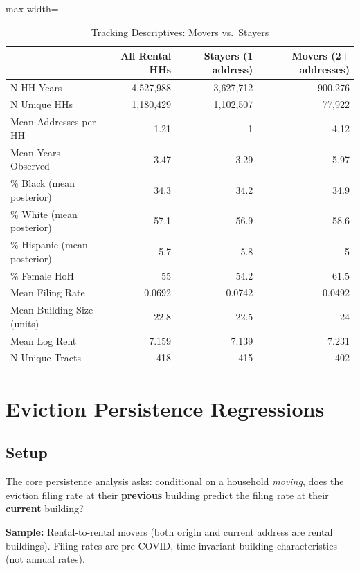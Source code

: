 \documentclass[
  11pt,
]{article}
\begin{document}
\begin{table}[htbp]
\centering
\centering
\caption{Tracking Descriptives: Movers vs.\ Stayers}
\label{tab:tracking_descriptives}

\begin{adjustbox}{max width=\textwidth}
\begin{tabular}{lrrr}
\toprule
 & All Rental HHs & Stayers (1 address) & Movers (2+ addresses) \\
\midrule
N HH-Years & 4,527,988 & 3,627,712 &   900,276 \\
N Unique HHs & 1,180,429 & 1,102,507 &    77,922 \\
Mean Addresses per HH & 1.21 & 1 & 4.12 \\
Mean Years Observed & 3.47 & 3.29 & 5.97 \\
\% Black (mean posterior) & 34.3 & 34.2 & 34.9 \\
\% White (mean posterior) & 57.1 & 56.9 & 58.6 \\
\% Hispanic (mean posterior) & 5.7 & 5.8 & 5 \\
\% Female HoH & 55 & 54.2 & 61.5 \\
Mean Filing Rate & 0.0692 & 0.0742 & 0.0492 \\
Mean Building Size (units) & 22.8 & 22.5 & 24 \\
Mean Log Rent & 7.159 & 7.139 & 7.231 \\
N Unique Tracts & 418 & 415 & 402 \\
\bottomrule
\end{tabular}

\end{adjustbox}
\end{table}

\section{Eviction Persistence
Regressions}\label{eviction-persistence-regressions}

\subsection{Setup}\label{setup}

The core persistence analysis asks: conditional on a household
\emph{moving}, does the eviction filing rate at their \textbf{previous}
building predict the filing rate at their \textbf{current} building?

\textbf{Sample:} Rental-to-rental movers (both origin and current
address are rental buildings). Filing rates are pre-COVID,
time-invariant building characteristics (not annual rates).
\end{document}

